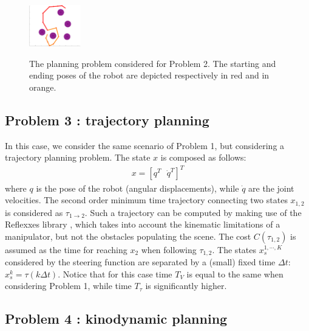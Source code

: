 \begin{figure}
	\centering
	\includegraphics[width=0.2\textwidth]{Immagini/pdf/problem_7gdl.pdf} \label{fig:Problem_A_01}
\caption{The planning problem considered for Problem 2. The starting and ending poses of the robot are depicted respectively in red and in orange. }
	\label{fig:Problem_2}
\end{figure}

\subsection{Problem 3 : trajectory planning}
\label{sec:probl_3}

In this case, we consider the same scenario of Problem 1, but considering a trajectory planning problem.
The state $x$ is composed as follows:
\begin{eqnarray}
x=[ q^{T} \,\,\,\, \dot{q}^{T} ]^{T}
\end{eqnarray}
where $q$ is the pose of the robot (angular displacements), while $\dot{q}$ are the joint velocities. The second order minimum time trajectory connecting two states $x_{1,2}$ is considered as $\tau_{1 \rightarrow 2}$. Such a trajectory can be computed by making use of the Reflexxes library \cite{Reflexxes}, which takes into account the kinematic limitations of a manipulator, but not the obstacles populating the scene. The cost $C(\tau_{1,2})$ is assumed  as the time for reaching $x_2$ when following $\tau_{1,2}$. The states $x^{1,\cdots,K}_s$ considered by the steering function are separated by a (small) fixed time $\Delta t$: $x^{k}_s = \tau(k \Delta t)$.
Notice that for this case time $T_V$ is equal to the same when considering Problem 1, while time $T_{\tau}$ is significantly higher.

\subsection{Problem 4 : kinodynamic planning}
\label{sec:probl_4}

